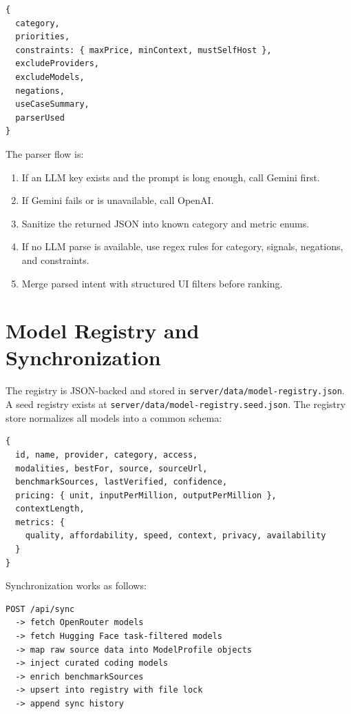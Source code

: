 \documentclass[11pt]{article}
\begin{document}
\begin{lstlisting}[style=code]
{
  category,
  priorities,
  constraints: { maxPrice, minContext, mustSelfHost },
  excludeProviders,
  excludeModels,
  negations,
  useCaseSummary,
  parserUsed
}
\end{lstlisting}

The parser flow is:

\begin{enumerate}[leftmargin=*]
  \item If an LLM key exists and the prompt is long enough, call Gemini first.
  \item If Gemini fails or is unavailable, call OpenAI.
  \item Sanitize the returned JSON into known category and metric enums.
  \item If no LLM parse is available, use regex rules for category, signals, negations, and constraints.
  \item Merge parsed intent with structured UI filters before ranking.
\end{enumerate}

\section{Model Registry and Synchronization}

The registry is JSON-backed and stored in \texttt{server/data/model-registry.json}. A seed registry exists at \texttt{server/data/model-registry.seed.json}. The registry store normalizes all models into a common schema:

\begin{lstlisting}[style=code]
{
  id, name, provider, category, access,
  modalities, bestFor, source, sourceUrl,
  benchmarkSources, lastVerified, confidence,
  pricing: { unit, inputPerMillion, outputPerMillion },
  contextLength,
  metrics: {
    quality, affordability, speed, context, privacy, availability
  }
}
\end{lstlisting}

Synchronization works as follows:

\begin{lstlisting}[style=code]
POST /api/sync
  -> fetch OpenRouter models
  -> fetch Hugging Face task-filtered models
  -> map raw source data into ModelProfile objects
  -> inject curated coding models
  -> enrich benchmarkSources
  -> upsert into registry with file lock
  -> append sync history
\end{lstlisting}
\end{document}
